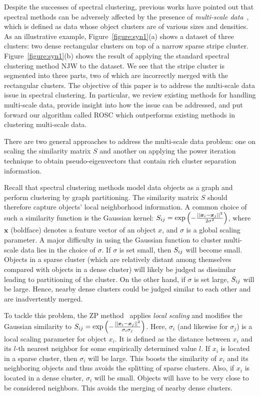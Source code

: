 Despite the successes of spectral clustering, previous works have
pointed out that spectral methods
can be adversely affected by the presence of 
\emph{multi-scale data}~\cite{zelnik2004self,nadler2006fundamental},
which is defined as data whose object clusters are of various sizes and densities.
As an illustrative example, 
Figure~\ref{figure:syn1}(a) shows a dataset of three clusters: 
two dense rectangular clusters on top of a narrow sparse stripe cluster.
Figure~\ref{figure:syn1}(b) shows the result of applying the standard spectral clustering method NJW
to the dataset. We see that the stripe cluster is segmented into three parts, two of which are
incorrectly merged with the rectangular clusters. 
The objective of this paper is to address the multi-scale data issue in spectral clustering. 
In particular, we review existing methods for handling multi-scale data, provide insight into how
the issue can be addressed, and put forward our algorithm called ROSC which outperforms existing 
methods in clustering multi-scale data.

There are two general approaches to address the multi-scale data problem: one on scaling the similarity matrix 
$S$ and another on applying the power iteration technique to obtain pseudo-eigenvectors that contain rich cluster separation
information.

Recall that spectral clustering methods model data objects as a graph and
perform clustering by graph partitioning.
The similarity matrix $S$ should therefore capture objects' local neighborhood information. 
A common choice of such a similarity function is the
Gaussian kernel:
$S_{ij} = \exp \left(-\frac{||\bm{x}_i-\bm{x}_j||^2}{2\sigma^2}\right)$,
where $\bm x$ (boldface) denotes a feature vector of an object $x$, 
and $\sigma$ is a global scaling parameter.
A major difficulty in using the Gaussian function to cluster multi-scale data lies in the choice of
$\sigma$. 
If $\sigma$ is set small, then $S_{ij}$ will become small.  Objects in a sparse cluster (which are 
relatively distant among themselves compared with objects in a dense cluster) will likely be
judged as dissimilar leading to partitioning of the cluster. On the other hand, if $\sigma$ is set large,
$S_{ij}$ will be large. Hence,
nearby dense clusters could be judged similar to each other and are inadvertently merged. 

To tackle this problem, the ZP method~\cite{zelnik2004self} applies {\it local scaling} and modifies the Gaussian similarity
to $S_{ij} = \exp\left (-\frac{||\bm{x}_i-\bm{x}_j||^2}{\sigma_i\sigma_j}\right)$.
Here, $\sigma_i$ (and likewise for $\sigma_j$) is a local scaling parameter for object $x_i$.
It is defined as the distance between $x_i$ and its $l$-th nearest neighbor for some 
empirically determined value $l$.
If $x_i$ is located in a sparse cluster, then $\sigma_i$ will be large.
This boosts the similarity of $x_i$ and its neighboring objects and thus avoids the splitting of 
sparse clusters. 
Also, if $x_i$ is located in a dense cluster, $\sigma_i$ will be small.
Objects will have to be very close to be considered neighbors.
This avoids the merging of nearby dense clusters. 


